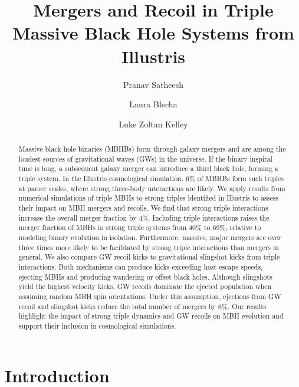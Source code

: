 \documentclass[twocolumn,linenumbers]{aastex701}
\begin{document}
\title{Mergers and Recoil in Triple Massive Black Hole Systems from Illustris}

\author{Pranav Satheesh}

\author{Laura Blecha}

\author{Luke Zoltan Kelley}

\begin{abstract}
Massive black hole binaries (MBHBs) form through galaxy mergers and are among the loudest sources of gravitational waves (GWs) in the universe. If the binary inspiral time is long, a subsequent galaxy merger can introduce a third black hole, forming a triple system. In the Illustris cosmological simulation, 6\% of MBHBs form such triples at parsec scales, where strong three-body interactions are likely. We apply results from numerical simulations of triple MBHs to strong triples identified in Illustris to assess their impact on MBH mergers and recoils. We find that strong triple interactions increase the overall merger fraction by $4\%$. Including triple interactions raises the merger fraction of MBHs in strong triple systems from 40\% to 69\%, relative to modeling binary evolution in isolation. Furthermore, massive, major mergers are over three times more likely to be facilitated by strong triple interactions than mergers in general. We also compare GW recoil kicks to gravitational slingshot kicks from triple interactions. Both mechanisms can produce kicks exceeding host escape speeds, ejecting MBHs and producing wandering or offset black holes. Although slingshots yield the highest velocity kicks, GW recoils dominate the ejected population when assuming random MBH spin orientations. Under this assumption, ejections from GW recoil and slingshot kicks reduce the total number of mergers by 6\%. Our results highlight the impact of strong triple dynamics and GW recoils on MBH evolution and support their inclusion in cosmological simulations.
\end{abstract}



\section{Introduction} 
\label{sec:intro}
\end{document}

